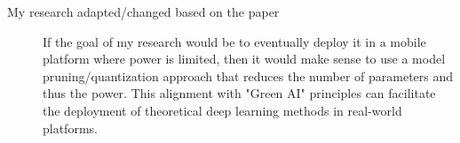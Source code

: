 \documentclass{article}
\begin{document}
\begin{description}
    \item[My research adapted/changed based on the paper] If the goal of my research would be to eventually deploy it in a mobile platform where power is limited, then it would make sense to use a model pruning/quantization approach that reduces the number of parameters and thus the power. This alignment with "Green AI" principles can facilitate the deployment of theoretical deep learning methods in real-world platforms.
\end{description}







\end{document}
